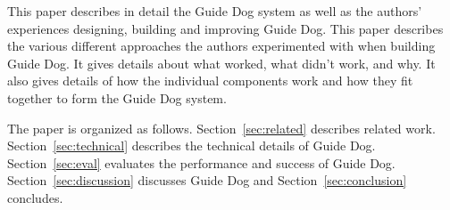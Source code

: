 This paper describes in detail the Guide Dog system as well as the authors'
experiences designing, building and improving Guide Dog. This paper describes
the various different approaches the authors experimented with when building
Guide Dog. It gives details about what worked, what didn't work, and why. It
also gives details of how the individual components work and how they fit together
to form the Guide Dog system.

The paper is organized as follows. Section~\ref{sec:related} describes related
work. Section~\ref{sec:technical} describes the technical details of Guide Dog.
Section~\ref{sec:eval} evaluates the performance and success of Guide Dog.
Section~\ref{sec:discussion} discusses Guide Dog and
Section~\ref{sec:conclusion} concludes.
